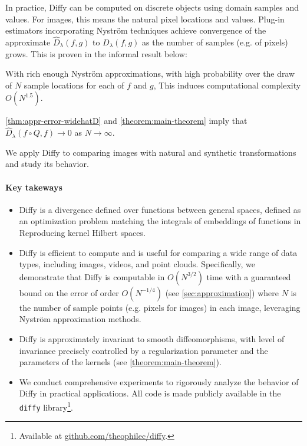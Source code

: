 In practice, Diffy can be computed on discrete objects using domain samples and values. For images, this means the natural pixel locations and values. Plug-in estimators incorporating Nyström techniques achieve convergence of the approximate $\hat D_\lambda(f, g)$ to $D_\lambda(f, g)$ as the number of samples (e.g. of pixels) grows. This is proven in the informal result below:
\begin{mdframed}
\begin{informaltheorem}
With rich enough Nyström approximations, with high probability over the draw of $N$ sample locations for each of $f$ and $g$,
This induces computational complexity $O(N^{1.5})$.
\end{informaltheorem}
\end{mdframed}
\noindent \cref{thm:appr-error-widehatD} and \cref{theorem:main-theorem} imply that $\hat D_\lambda(f\circ Q, f)\to 0$ as $N\to \infty$.

We apply Diffy to comparing images with natural and synthetic transformations and study its behavior.

\paragraph{Key takeways}

\begin{itemize}
    \item Diffy is a divergence defined over functions between general spaces, defined as an optimization problem matching the integrals of embeddings of functions in Reproducing kernel Hilbert spaces.
    \item Diffy is efficient to compute and is useful for comparing a wide range of data types, including images, videos, and point clouds. Specifically, we demonstrate that Diffy is computable in $O(N^{3/2})$ time with a guaranteed bound on the error of order $O(N^{-1/4})$ (see \cref{sec:approximation}) where $N$ is the number of sample points (e.g. pixels for images) in each image, leveraging Nyström approximation methods.
    \item Diffy is approximately invariant to smooth diffeomorphisms, with level of invariance precisely controlled by a regularization parameter and the parameters of the kernels (see \cref{theorem:main-theorem}).
    \item We conduct comprehensive experiments to rigorously analyze the behavior of Diffy in practical applications. All code is made publicly available in the \texttt{diffy} library\footnote{Available at \url{github.com/theophilec/diffy}.}.
\end{itemize}


